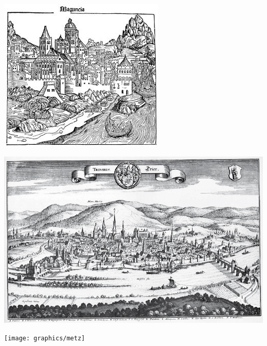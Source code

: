 \documentclass[
]{book}
\begin{document}
\begin{center}\includegraphics[width=1\linewidth]{graphics/mainz-germany-1493-woodcut-hartmann-schedels-12423049} \end{center}

\begin{center}\includegraphics[width=1\linewidth]{graphics/9789004378216_webready_content_m00191} \end{center}

\begin{center}\texttt{[image: graphics/metz]} \end{center}
\end{document}

